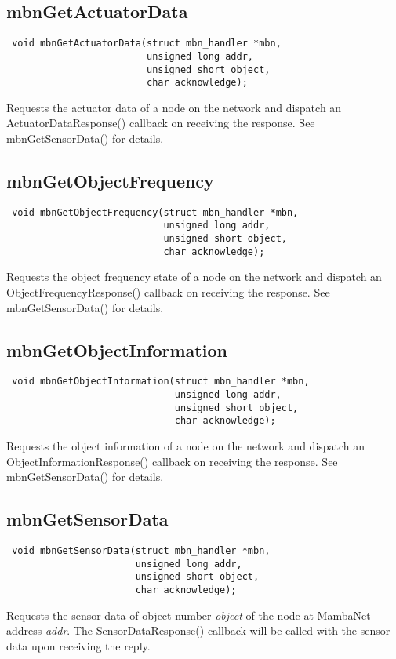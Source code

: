 \documentclass[a4paper]{report}
\begin{document}
\subsection{mbnGetActuatorData}
\begin{verbatim}
 void mbnGetActuatorData(struct mbn_handler *mbn,
                         unsigned long addr,
                         unsigned short object,
                         char acknowledge);
\end{verbatim}
Requests the actuator data of a node on the network and dispatch an ActuatorDataResponse() callback on receiving the response. See mbnGetSensorData() for details.


\subsection{mbnGetObjectFrequency}
\begin{verbatim}
 void mbnGetObjectFrequency(struct mbn_handler *mbn,
                            unsigned long addr,
                            unsigned short object,
                            char acknowledge);
\end{verbatim}
Requests the object frequency state of a node on the network and dispatch an ObjectFrequencyResponse() callback on receiving the response. See mbnGetSensorData() for details.


\subsection{mbnGetObjectInformation}
\begin{verbatim}
 void mbnGetObjectInformation(struct mbn_handler *mbn,
                              unsigned long addr,
                              unsigned short object,
                              char acknowledge);
\end{verbatim}
Requests the object information of a node on the network and dispatch an ObjectInformationResponse() callback on receiving the response. See mbnGetSensorData() for details.


\subsection{mbnGetSensorData}
\begin{verbatim}
 void mbnGetSensorData(struct mbn_handler *mbn,
                       unsigned long addr,
                       unsigned short object,
                       char acknowledge);
\end{verbatim}
Requests the sensor data of object number \textit{object} of the node at MambaNet address \textit{addr}. The SensorDataResponse() callback will be called with the sensor data upon receiving the reply.
\end{document}
